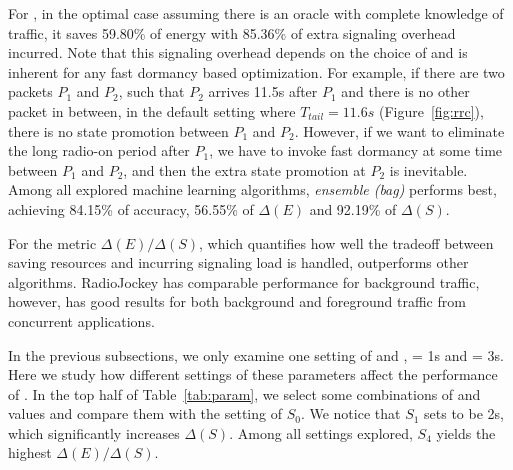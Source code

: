 For \NAME, in the optimal case assuming there is an oracle with complete knowledge of traffic, it saves 59.80\% of energy with 85.36\% of extra signaling overhead incurred. Note that this signaling overhead depends on the choice of \SBT and is inherent for any fast dormancy based optimization. For example, if there are two packets $P_{1}$ and $P_{2}$, such that $P_{2}$ arrives 11.5s after $P_{1}$ and there is no other packet in between, in the default setting where $T_{tail} = 11.6s$ (Figure~\ref{fig:rrc}), there is no state promotion between $P_{1}$ and $P_{2}$. However, if we want to eliminate the long radio-on period after $P_{1}$, we have to invoke fast dormancy at some time between $P_{1}$ and $P_{2}$, and then the extra state promotion at $P_{2}$ is inevitable. Among all explored machine learning algorithms, {\em ensemble (bag)} performs best, achieving 84.15\% of accuracy, 56.55\% of $\Delta(E)$ and 92.19\% of $\Delta(S)$.

For the metric $\Delta(E)/\Delta(S)$, which quantifies how well the tradeoff between saving resources and incurring signaling load is handled, \NAME outperforms other algorithms. RadioJockey has comparable performance for background traffic, however, \NAME has good results for both background and foreground traffic from concurrent applications.


In the previous subsections, we only examine one setting of \BT and \SBT, \ie \BT = 1s and \SBT = 3s. Here we study how different settings of these parameters affect the performance of \NAME. In the top half of Table~\ref{tab:param}, we select some combinations of \BT and \SBT values and compare them with the setting of $S_{0}$. We notice that $S_{1}$ sets \SBT to be 2s, which significantly increases $\Delta(S)$. Among all settings explored, $S_{4}$ yields the highest $\Delta(E)/\Delta(S)$.

